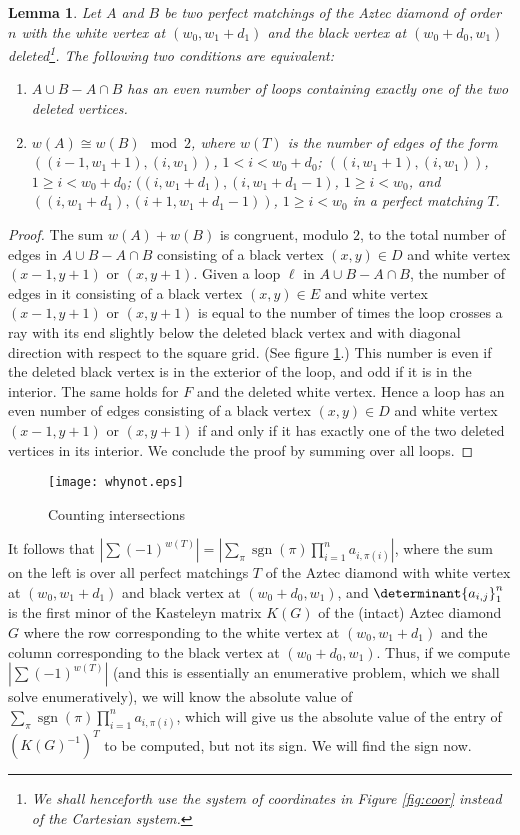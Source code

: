 \documentclass[10pt,reqno]{amsart}
\theoremstyle{plain}
\newtheorem{Lem}[Thm]{Lemma}
\theoremstyle{definition}
\theoremstyle{remark}
\DeclareMathOperator{\sgn }{sgn }
\begin{document}
\begin{Lem}\label{Lem:opposum}
Let $A$ and $B$ be two perfect matchings of the Aztec diamond of 
order $n$ with the white vertex at $(w_0,w_1+d_1)$ and the black
vertex at $(w_0+d_0,w_1)$ deleted\footnote{We shall henceforth use
the system of coordinates in Figure
\ref{fig:coor} instead of the Cartesian system.}.
The following two conditions are equivalent:
\begin{enumerate}
\item $A\cup B - A\cap B$ has an even number of loops
containing exactly one of the two deleted vertices.
\item $w(A) \cong w(B) \mod 2$, where 
$w(T)$ is the number of edges of the form $((i-1,w_1+1),(i,w_1))$,
$1<i<w_0+d_0$; $((i,w_1+1),(i,w_1))$, $1\geq i<w_0+d_0$;
$((i,w_1+d_1),(i,w_1+d_1-1)$, $1\geq i<w_0$, and
$((i,w_1+d_1),(i+1,w_1+d_1-1))$, $1\geq i<w_0$ in a perfect matching $T$.
\end{enumerate}
\end{Lem}
\begin{proof}
The sum $w(A) + w(B)$ is congruent, modulo $2$, to
the total number of edges in $A\cup B - A\cap B$ consisting 
of a black vertex $(x,y)\in D$
and white vertex $(x-1,y+1)$ or $(x,y+1)$. Given a loop $\ell $
in $A\cup B - A\cap B$, the number of edges in it consisting
of a black vertex $(x,y)\in E$
and white vertex $(x-1,y+1)$ or $(x,y+1)$ is equal to the number
of times the loop crosses a ray with its end slightly below
the deleted black vertex and with diagonal direction with respect
to the square grid. (See figure \ref{fig:whynot}.)
 This number is even if  the deleted
black vertex is in the exterior of the loop, and odd if it is in the interior.
The same holds for $F$ and the deleted white vertex. Hence
a loop has an even number of edges consisting of a black vertex $(x,y)\in D$
and white vertex $(x-1,y+1)$ or $(x,y+1)$ if and only if it has exactly
one of the two deleted vertices in its interior. We conclude the proof
by summing over all loops.
\end{proof}

\begin{figure}
\centering
	\texttt{[image: whynot.eps]}
	\caption{Counting intersections}\label{fig:whynot}
\end{figure}

It follows that $|\sum (-1)^{w(T)}| = 
|\sum_{\pi } \sgn(\pi ) \prod_{i=1}^n a_{i,\pi(i)} |$, where
the sum on the left is over all perfect matchings $T$ of the Aztec
diamond with white vertex at $(w_0,w_1+d_1)$ and black
vertex at $(w_0+d_0,w_1)$, and $\determinant{a_{i,j}}_1^n$ is the
first minor of the Kasteleyn matrix $K(G)$ of the (intact) Aztec diamond $G$
where the row corresponding to the white vertex at $(w_0,w_1+d_1)$
and the column corresponding to the black vertex at $(w_0+d_0,w_1)$.
Thus, if we compute $|\sum (-1)^{w(T)}|$ (and this is essentially
an enumerative problem, which we shall solve enumeratively), we will
know the absolute value of 
$\sum_{\pi } \sgn(\pi ) \prod_{i=1}^n a_{i,\pi(i)}$, which
will give us the absolute value of the entry of $(K(G)^{-1})^T$ to
be computed, but not its sign. We will find the sign now.
\end{document}
